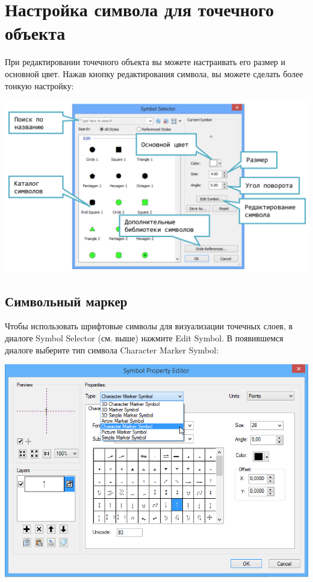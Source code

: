 \documentclass[]{book}
\theoremstyle{definition}
\theoremstyle{definition}
\theoremstyle{definition}
\theoremstyle{remark}
\begin{document}
\hypertarget{manual-vector-point}{%
\section{Настройка символа для точечного
объекта}\label{manual-vector-point}}

При редактировании точечного объекта вы можете настраивать его размер и
основной цвет. Нажав кнопку редактирования символа, вы можете сделать
более тонкую настройку:

\includegraphics{images/Appendix/image25.png}

\hypertarget{manual-vector-symbol}{%
\subsection{Символьный маркер}\label{manual-vector-symbol}}

Чтобы использовать шрифтовые символы для визуализации точечных слоев, в
диалоге Symbol Selector (см. выше) нажмите Edit Symbol. В появившемся
диалоге выберите тип символа Character Marker Symbol:

\includegraphics{images/Appendix/image26.png}
\end{document}
